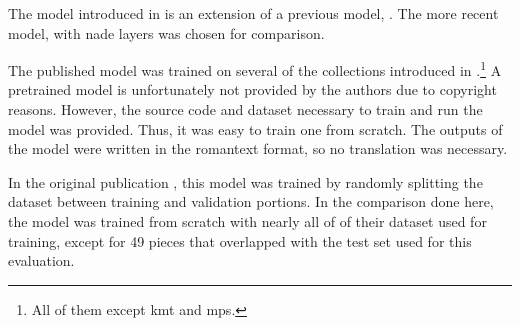 
The model introduced in \textcite{micchi2021deep} is an
extension of a previous model, \textcite{micchi2020not}. The
more recent model, with \gls{nade} layers was chosen for
comparison.

The published model was trained on several of the
collections introduced in
.\footnote{All of
them except \gls{kmt} and \gls{mps}.} A pretrained model is
unfortunately not provided by the authors due to copyright
reasons. However, the source code and dataset necessary to
train and run the model was provided. Thus, it was easy to
train one from scratch. The outputs of the model were
written in the \gls{romantext} format, so no translation was
necessary. 

In the original publication \parencite{micchi2021deep}, this
model was trained by randomly splitting the dataset between
training and validation portions. In the comparison done
here, the model was trained from scratch with nearly all of
of their dataset used for training, except for 49 pieces
that overlapped with the test set used for this evaluation.
